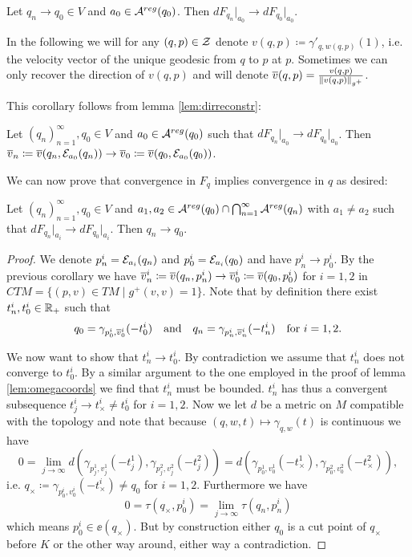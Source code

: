 \begin{corollary}\label{cor:dfpwconv}
    Let $q_n\to q_0\in V$ and $a_0\in {{\mathcal{A}}^{reg}}(q_0)$. Then $dF_{q_n}\rvert_{a_0} \to dF_{q_0}\rvert_{a_0}$.
\end{corollary}



In the following we will for any $(q,p)\in {\mathcal{Z}}$ denote $v(q,p)\coloneqq \gamma'_{q,w(q,p)}(1)$, i.e. the velocity vector of the unique geodesic from $q$ to $p$ at $p$. Sometimes we can only recover the direction of $v(q,p)$ and will denote ${\overline{v}}(q,p) = \frac{v(q,p)}{\lVert v(q,p) \rVert_{g^+}}$.

This corollary follows from lemma \ref{lem:dirreconstr}:
\begin{corollary}\label{cor:dfconvimplpliesvconv}
    Let $(q_n)_{n=1}^\infty, q_0\in V$ and $a_0\in {{\mathcal{A}}^{reg}}(q_0)$ such that $dF_{q_n}\rvert_{a_0} \to dF_{q_0}\rvert_{a_0}$. Then ${\overline{v}}_n\coloneqq {\overline{v}}(q_n,{\mathcal{E}}_{a_0}(q_n))\to {\overline{v}}_0\coloneqq {\overline{v}}(q_0,{\mathcal{E}}_{a_0}(q_0))$.
\end{corollary}

We can now prove that convergence in $F_q$ implies convergence in $q$ as desired:
\begin{proposition}\label{prop:dfconvimplqconv}
    Let $(q_n)_{n=1}^\infty, q_0\in V$ and $a_1,a_2\in {{\mathcal{A}}^{reg}}(q_0) \cap \bigcap_{n=1}^\infty {{\mathcal{A}}^{reg}}(q_n)$ with $a_1\neq a_2$ such that $dF_{q_n}\rvert_{a_i} \to dF_{q_0}\rvert_{a_i}$. Then $q_n \to q_0$.
\end{proposition}
\begin{proof}
    We denote $p_n^i = {\mathcal{E}}_{a_i}(q_n)$ and $p_0^i = {\mathcal{E}}_{a_i}(q_0)$ and have $p^i_n \to p^i_0$.
    By the previous corollary we have ${\overline{v}}^i_n\coloneqq {\overline{v}}(q_n,p_n^i)\to {\overline{v}}^i_0\coloneqq {\overline{v}}(q_0,p_0^i)$ for $i=1,2$ in $CTM=\{(p,v)\in TM \mid g^+(v,v)=1\}$.
    Note that by definition there exist $t^i_n, t^i_0 \in \mathbb{R}_+$ such that 
    \[
        q_0 = \gamma_{p^i_0,{\overline{v}}^i_0}(-t^i_0) \quad \text{and} \quad q_n = \gamma_{p^i_n,{\overline{v}}^i_n}(-t^i_n) \quad \text{for }i = 1,2.
    \]

    We now want to show that $t^i_n\to t^i_0$. By contradiction we assume that $t^i_n$ does not converge to $t^i_0$. By a similar argument to the one employed in the proof of lemma \ref{lem:omegacoords} we find that $t^i_n$ must be bounded. $t^i_n$ has thus a convergent subsequence $t^i_j\to t^i_\times \neq t^i_0$ for $i=1,2$. Now we let $d$ be a metric on $M$ compatible with the topology and note that because $(q,w,t)\mapsto \gamma_{q,w}(t)$ is continuous we have
    \[
        0 = \lim_{j\to \infty} d(\gamma_{p^1_j,v^1_j}(-t^1_j),\gamma_{p^2_j,v^2_j}(-t^2_j)) = d(\gamma_{p^1_0,v^1_0}(-t^1_\times),\gamma_{p^2_0,v^2_0}(-t^2_\times)),
    \]i.e. $q_\times\coloneqq \gamma_{p^i_0,v^i_0}(-t^i_\times)\neq q_0$ for $i=1,2$. Furthermore we have 
    \[
        0 = \tau(q_\times,p^i_0) = \lim_{j\to \infty} \tau(q_n,p^i_n)
    \] which means $p^i_0\in \ee(q_\times)$. But by construction either $q_0$ is a cut point of $q_\times$ before $K$ or the other way around, either way a contradiction.
\end{proof}


